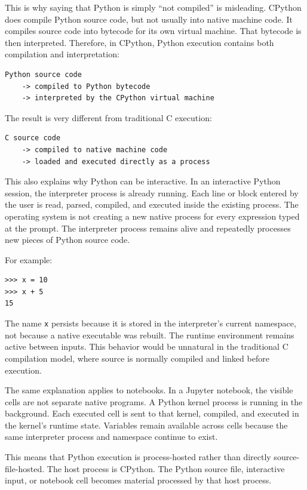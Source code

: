 \documentclass[a4paper,twoside]{report}
\begin{document}
This is why saying that Python is simply ``not compiled'' is misleading. CPython does compile Python source code, but not usually into native machine code. It compiles source code into bytecode for its own virtual machine. That bytecode is then interpreted. Therefore, in CPython, Python execution contains both compilation and interpretation:

\begin{verbatim}
Python source code
    -> compiled to Python bytecode
    -> interpreted by the CPython virtual machine
\end{verbatim}

The result is very different from traditional C execution:

\begin{verbatim}
C source code
    -> compiled to native machine code
    -> loaded and executed directly as a process
\end{verbatim}

This also explains why Python can be interactive. In an interactive Python session, the interpreter process is already running. Each line or block entered by the user is read, parsed, compiled, and executed inside the existing process. The operating system is not creating a new native process for every expression typed at the prompt. The interpreter process remains alive and repeatedly processes new pieces of Python source code.

For example:

\begin{verbatim}
>>> x = 10
>>> x + 5
15
\end{verbatim}

The name \texttt{x} persists because it is stored in the interpreter's current namespace, not because a native executable was rebuilt. The runtime environment remains active between inputs. This behavior would be unnatural in the traditional C compilation model, where source is normally compiled and linked before execution.

The same explanation applies to notebooks. In a Jupyter notebook, the visible cells are not separate native programs. A Python kernel process is running in the background. Each executed cell is sent to that kernel, compiled, and executed in the kernel's runtime state. Variables remain available across cells because the same interpreter process and namespace continue to exist.

This means that Python execution is process-hosted rather than directly source-file-hosted. The host process is CPython. The Python source file, interactive input, or notebook cell becomes material processed by that host process.
\end{document}

